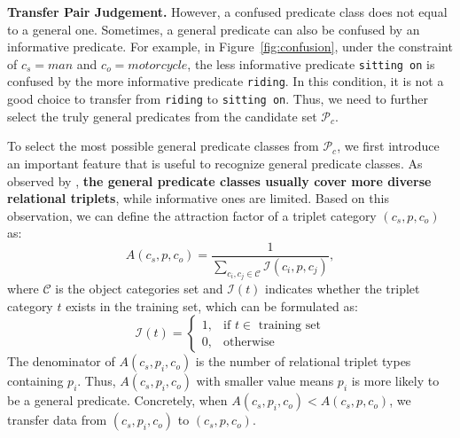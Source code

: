 \documentclass[runningheads]{llncs}
\begin{document}
\smallskip
\noindent
\textbf{Transfer Pair Judgement.}
However, a confused predicate class does not equal to a general one.
Sometimes, a general predicate can also be confused by an informative predicate.
For example, in Figure~\ref{fig:confusion}, under the constraint of $c_s=man$ and $c_o=motorcycle$, the less informative predicate \texttt{sitting on} is confused by the more informative predicate \texttt{riding}.
In this condition, it is not a good choice to transfer from \texttt{riding} to \texttt{sitting on}.
Thus, we need to further select the truly general predicates from the candidate set $\mathcal{P}_c$.


To select the most possible general predicate classes from $\mathcal{P}_c$, we first introduce an important feature that is useful to recognize general predicate classes. As observed by \cite{yu2020cogtree}, \textbf{the general predicate classes usually cover more diverse relational triplets}, while informative ones are limited.
Based on this observation, we can define the attraction factor of a triplet category $(c_s, p, c_o)$ as:
\begin{equation}
    A(c_s, p, c_o) = \frac{1}{\sum_{c_i, c_j \in \mathcal{C}}{\mathcal{I}(c_i, p, c_j)}},
\end{equation}
where $\mathcal{C}$ is the object categories set and $\mathcal{I}(t)$ indicates whether the triplet category $t$ exists in the training set, which can be formulated as:
\begin{equation}
    \mathcal{I}(t) = 
    \begin{cases}
    1, &\text{if $t \in$ training set}\\
    0, &\text{otherwise}
    \end{cases}
\end{equation}
The denominator of $A(c_s, p_i, c_o)$ is the number of relational triplet types containing $p_i$. 
Thus, $A(c_s, p_i, c_o)$ with smaller value means $p_i$ is more likely to be a general predicate.
Concretely, when $A(c_s, p_i, c_o) < A(c_s, p, c_o)$, we transfer data from $(c_s, p_i, c_o)$ to $(c_s, p, c_o)$.
\end{document}
